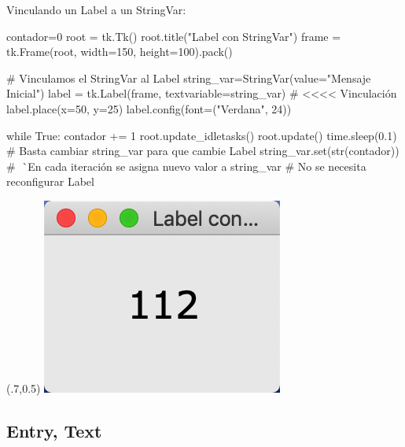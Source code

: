 \documentclass[10pt, envcountsect , spanish]{beamer}
\begin{document}
\begin{frame}[fragile]{Vinculando un Label a un StringVar: }
\small
\begin{pyverbatim}[][frame=single]
contador=0
root = tk.Tk()
root.title("Label con StringVar")
frame = tk.Frame(root, width=150, height=100).pack()

# Vinculamos el StringVar al Label
string_var=StringVar(value="Mensaje Inicial")
label = tk.Label(frame, textvariable=string_var) # <<<< Vinculación
label.place(x=50, y=25)
label.config(font=("Verdana", 24))

while True:
    contador += 1
    root.update_idletasks()
    root.update()
    time.sleep(0.1)
    # Basta cambiar string_var para que cambie Label
    string_var.set(str(contador))
    # ^^^^^ En cada iteración se asigna nuevo valor a string_var
    #       No se necesita reconfigurar Label
\end{pyverbatim}

\begin{textblock*}{.25\textwidth}(.7\textwidth,0.5\textheight)
\includegraphics[width=\textwidth]{fig/label-stringvar}
\end{textblock*}

\end{frame}






\subsection{Entry, Text}
\end{document}
